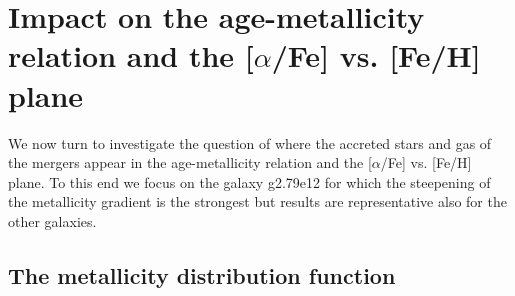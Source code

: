 \documentclass[useAMS,usenatbib]{mnras}
\begin{document}
\section{Impact on the age-metallicity relation and the [$\alpha$/Fe] vs. [Fe/H] plane} \label{sec:results-age}

We now turn to investigate the question of where the accreted stars and gas of the mergers appear in the age-metallicity relation and the [$\alpha$/Fe] vs. [Fe/H] plane. To this end we focus on the galaxy g2.79e12 for which the steepening of the metallicity gradient is the strongest but results are representative also for the other galaxies.

\subsection{The metallicity distribution function}
\label{sec:mdf}
\end{document}
